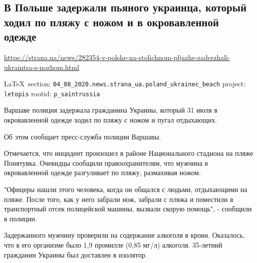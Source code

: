  
 
\subsection{В Польше задержали пьяного украинца, который ходил по пляжу с ножом и в окровавленной одежде}
\label{sec:04_08_2020.news.strana_ua.poland_ukrainec_beach}
\url{https://strana.ua/news/282354-v-polshe-na-stolichnom-pljazhe-zaderzhali-ukraintsa-s-nozhom.html}
  
\vspace{0.5cm}
 {\ifDEBUG\small\LaTeX~section: \verb|04_08_2020.news.strana_ua.poland_ukrainec_beach| project: \verb|letopis| rootid: \verb|p_saintrussia| \fi}
\vspace{0.5cm}

Варшаве полиция задержала гражданина Украины, который 31 июля в окровавленной
одежде ходил по пляжу с ножом и пугал отдыхающих. 

Об этом сообщает пресс-служба полиции Варшавы.

Отмечается, что инцидент произошел в районе Национального стадиона на пляже
Понятувка. Очевидцы сообщили правоохранителям, что мужчина в окровавленной
одежде разгуливает по пляжу, размахивая ножом.

"Офицеры нашли этого человека, когда он общался с людьми, отдыхающими на пляже.
После того, как у него забрали нож, забрали с пляжа и поместили в транспортный
отсек полицейской машины, вызвали скорую помощь", - сообщили в полиции.

Задержанного мужчину проверили на содержание алкоголя в крови. Оказалось, что в
его организме было 1,9 промилле (0,85 мг/л) алкоголя. 35-летний гражданин
Украины был доставлен в изолятор.
  
